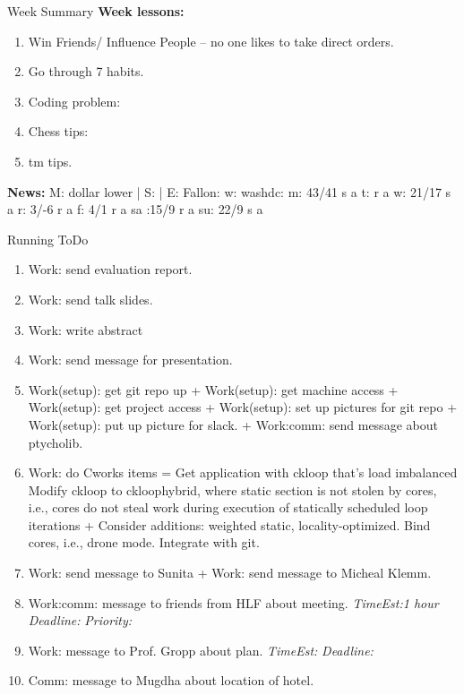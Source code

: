 \documentclass[serif, mathserif, final]{beamer}
\newcommand{\te}[1]{\textit{TimeEst:}\textit{#1}}
\newcommand{\dl}[1]{\textit{Deadline:}\textit{#1}}
\newcommand{\pr}[1]{\textit{Priority:}\textit{#1}}
\begin{document}
\begin{frame}
\begin{columns}
\begin{column}{0.5\linewidth}
\begin{block}{Week Summary}
    {\tiny {\bf Week lessons:}}
    \begin{enumerate}
      \tiny \item \tiny Win Friends/ Influence People – no one
      likes to take direct orders.
    \item \tiny Go through 7 habits.
    \item \tiny Coding problem: 
    \item \tiny Chess tips: 
    \item \tiny tm tips.
    \end{enumerate}
        {{\tiny {\bf News:}} M: dollar lower | S: 
          | E: Fallon: 
          w: washdc: {m: {43/41 s a}}  t:{ r a} {w: {21/17 s a}} {r:
            {3/-6 r a}} {f: {4/1 r a}} {sa :{15/9 r a} }
          {su: {22/9 s a  }}}
  \end{block} 

  \begin{block}{Running ToDo} %
    \begin{enumerate} 
    {\bf Curr} $\rightarrow$ \\
    
    \tiny \item \tiny Work: send evaluation report.
  \item \tiny Work: send talk slides.  

  \item \tiny Work: write abstract 


    
    
  \item \tiny Work: send message for presentation. 
    \tiny \item \tiny Work(setup): get git repo up + Work(setup): get
    machine access + Work(setup): get project access + Work(setup):
    set up pictures for git repo + Work(setup): put up picture for
    slack. +  Work:comm: send message about ptycholib.
  \item \tiny Work: do Cworks items = Get application with ckloop
    that’s load imbalanced Modify ckloop to ckloophybrid, where
    static section is not stolen by cores, i.e., cores do not steal
    work during execution of statically scheduled loop iterations +
    Consider additions: weighted static, locality-optimized. Bind
    cores, i.e., drone mode. Integrate with git. 
 
  \item \tiny Work: send message to Sunita + Work: send message to Micheal Klemm.
  \item \tiny Work:comm: message to friends from HLF about meeting. \te{1 hour}
    \dl{} \pr{ } 
  \item \tiny Work: message to Prof. Gropp about plan. \te{} \dl{} 
  \item \tiny Comm: message to Mugdha about location of hotel. 


\end{enumerate}
\end{block}
\end{column}
\end{columns}
\end{frame}
\end{document}
